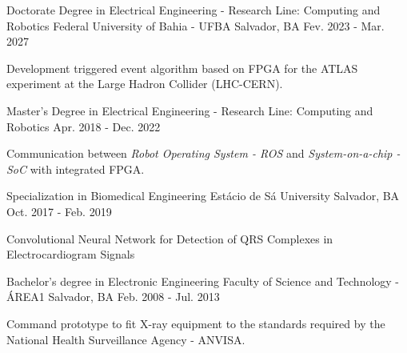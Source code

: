 

\begin{cventries}

  \cventry
    {Doctorate Degree in Electrical Engineering - Research Line: Computing and Robotics} %
    {Federal University of Bahia - UFBA} %
    {Salvador, BA} %
    {Fev. 2023 - Mar. 2027} %
    {
      \begin{cvitems} %
        \item {Development triggered event algorithm based on FPGA for the ATLAS experiment at the Large Hadron Collider (LHC-CERN).}
      \end{cvitems}
    }


  \cventry
    {Master's Degree in Electrical Engineering - Research Line: Computing and Robotics} %
    {} %
    {} %
    {Apr. 2018 - Dec. 2022} %
    {
      \begin{cvitems} %
        \item {Communication between \textit{Robot Operating System - ROS} and \textit{System-on-a-chip - SoC} with integrated FPGA.}
      \end{cvitems}
    }


  \cventry
    {Specialization in Biomedical Engineering} %
    {Estácio de Sá University} %
    {Salvador, BA} %
    {Oct. 2017 - Feb. 2019} %
    {
      \begin{cvitems} %
        \item {Convolutional Neural Network for Detection of QRS Complexes in Electrocardiogram Signals}
      \end{cvitems}
    }


  \cventry
    {Bachelor's degree in Electronic Engineering} %
    {Faculty of Science and Technology - ÁREA1} %
    {Salvador, BA} %
    {Feb. 2008 - Jul. 2013} %
    {
      \begin{cvitems} %
        \item {Command prototype to fit X-ray equipment to the standards required by the National Health Surveillance Agency - ANVISA.}
      \end{cvitems}
    }

\end{cventries}
